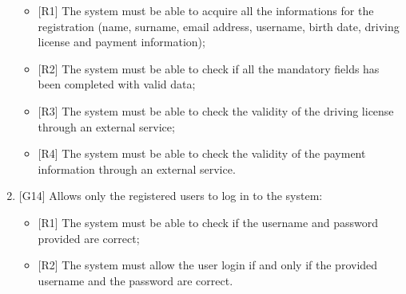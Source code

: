 \begin{enumerate}
\begin{itemize}
	\item {[R1]} The system must be able to acquire all the informations for the registration (name, surname, email address, username, birth date, driving license and payment information);
	\item {[R2]} The system must be able to check if all the mandatory fields has been completed with valid data;
	\item {[R3]} The system must be able to check the validity of the driving license through an external service;
	\item {[R4]} The system must be able to check the validity of the payment information through an external service.
\end{itemize}

\item {[G14]} Allows only the registered users to log in to the system:

\begin{itemize}
	\item {[R1]} The system must be able to check if the username and password provided are correct;
	\item {[R2]} The system must allow the user login if and only if the provided username and the password are correct.
\end{itemize}

\end{enumerate}
